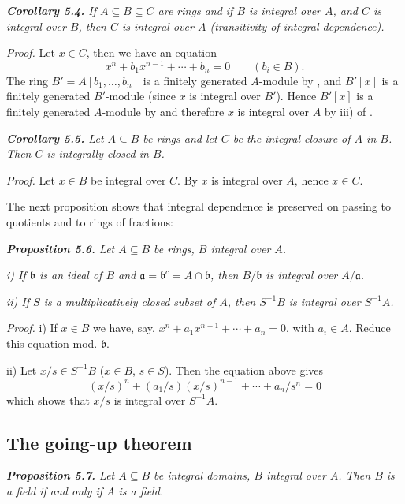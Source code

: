 \medskip
\noindent\textit{\textbf{Corollary 5.4.} If $A\subseteq B\subseteq C$ are rings and if $B$ is integral over $A$, and $C$ is
integral over $B$, then $C$ is integral over $A$ (transitivity of integral dependence).}

\noindent\emph{Proof.}  Let $x\in C$, then we have an equation
\[
x^n+b_1x^{n-1}+\cdots+b_n=0\qquad(b_i\in B).
\]
The ring $B'=A[b_1,\ldots,b_n]$ is a finitely generated $A$-module by , and $B'[x]$
is a finitely generated $B'$-module (since $x$ is integral over $B'$).  Hence $B'[x]$ is a
finitely generated $A$-module by  and therefore $x$ is integral over $A$ by iii)
of .\proofbox

\medskip
\noindent\textit{\textbf{Corollary 5.5.} Let $A\subseteq B$ be rings and let $C$ be the integral closure of $A$
in $B$.  Then $C$ is integrally closed in $B$.}

\noindent\emph{Proof.}  Let $x\in B$ be integral over $C$.  By  $x$ is integral over $A$, hence
$x\in C$.\proofbox

The next proposition shows that integral dependence is preserved on passing
to quotients and to rings of fractions:

\medskip
\noindent\textit{\textbf{Proposition 5.6.} Let $A\subseteq B$ be rings, $B$ integral over $A$.}

\noindent\textit{i) If $\mathfrak b$ is an ideal of $B$ and $\mathfrak a=\mathfrak b^c=A\cap\mathfrak b$, then $B/\mathfrak b$ is integral over $A/\mathfrak a$.}

\noindent\textit{ii) If $S$ is a multiplicatively closed subset of $A$, then $S^{-1}B$ is integral over
$S^{-1}A$.}

\noindent\emph{Proof.}  i) If $x\in B$ we have, say, $x^n+a_1x^{n-1}+\cdots+a_n=0$, with $a_i\in A$.
Reduce this equation mod. $\mathfrak b$.

ii) Let $x/s\in S^{-1}B$ ($x\in B$, $s\in S$).  Then the equation above gives
\[
(x/s)^n+(a_1/s)(x/s)^{n-1}+\cdots+a_n/s^n=0
\]
which shows that $x/s$ is integral over $S^{-1}A$.\proofbox

\subsection{The going-up theorem}

\medskip
\noindent\textit{\textbf{Proposition 5.7.} Let $A\subseteq B$ be integral domains, $B$ integral over $A$.  Then $B$
is a field if and only if $A$ is a field.}


